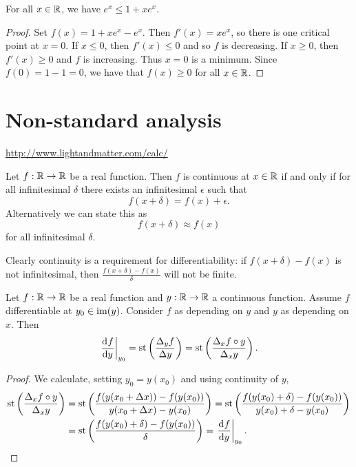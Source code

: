 \begin{lemma} \label{expInequality}
For all $x\in \mathbb{R}$, we have $e^x \leq 1 + xe^x$.
\end{lemma}
\begin{proof}
Set $f(x) = 1+xe^x - e^x$. Then $f'(x) = xe^x$, so there is one critical point at $x=0$. If $x \leq 0$, then $f'(x) \leq 0$ and so $f$ is decreasing. If $x \geq 0$, then $f'(x) \geq 0$ and $f$ is increasing. Thus $x=0$ is a minimum. Since $f(0) = 1 - 1 = 0$, we have that $f(x) \geq 0$ for all $x\in \mathbb{R}$.
\end{proof}

\section{Non-standard analysis}
\url{http://www.lightandmatter.com/calc/}

\begin{proposition}
Let $f:\mathbb{R}\to\mathbb{R}$ be a real function. Then $f$ is continuous at $x\in\mathbb{R}$ \textup{if and only if} for all infinitesimal $\delta$ there exists an infinitesimal $\epsilon$ such that
\[ f(x+\delta) = f(x) + \epsilon. \]
Alternatively we can state this as
\[ f(x+\delta) \approx f(x) \]
for all infinitesimal $\delta$.
\end{proposition}

Clearly continuity is a requirement for differentiability: if $f(x+\delta) - f(x)$ is not infinitesimal, then $\frac{f(x+\delta) - f(x)}{\delta}$ will not be finite.

\begin{lemma} \label{chainLemma}
Let $f:\mathbb{R}\to\mathbb{R}$ be a real function and $y:\mathbb{R}\to\mathbb{R}$ a continuous function. Assume $f$ differentiable at $y_0\in\operatorname{im}(y)$. Consider $f$ as depending on $y$ and $y$ as depending on $x$. Then
\[ \left.\mathinner{ \dfrac{\operatorname{d \!}{^{}}f}{\operatorname{d \!}{{y}^{}}} }\right|_{y_0} = \operatorname{st}\left(\frac{\Delta_y f}{\Delta y}\right) = \operatorname{st}\left(\frac{\Delta_x f\circ y}{\Delta_x y}\right). \]
\end{lemma}
\begin{proof}
We calculate, setting $y_0 = y(x_0)$ and using continuity of $y$,
\begin{align*}
\operatorname{st}\left(\frac{\Delta_x f\circ y}{\Delta_x y}\right) &= \operatorname{st}\left(\frac{f(y(x_0+\Delta x)) -f(y(x_0))}{y(x_0+\Delta x) - y(x_0)}\right) = \operatorname{st}\left(\frac{f(y(x_0)+\delta) -f(y(x_0))}{y(x_0)+\delta - y(x_0)}\right) \\
&= \operatorname{st}\left(\frac{f(y(x_0)+\delta) -f(y(x_0))}{\delta}\right) = \left.\mathinner{ \dfrac{\operatorname{d \!}{^{}}f}{\operatorname{d \!}{{y}^{}}} }\right|_{y_0}.
\end{align*}
\end{proof}

